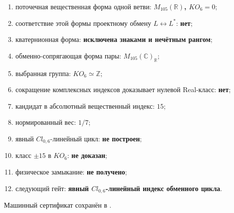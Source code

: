 \begin{protocol}
\begin{enumerate}
 \item поточечная вещественная форма одной ветви:
 \textbf{$M_{105}(\mathbb R)$, $KO_6=0$};
 \item соответствие этой формы проектному обмену $L\leftrightarrow L^*$:
 \textbf{нет};
 \item кватернионная форма: \textbf{исключена знаками и нечётным рангом};
 \item обменно-сопрягающая форма пары:
 \textbf{$M_{105}(\mathbb C)_{\mathbb R}$};
 \item выбранная группа: \textbf{$KO_6\simeq\mathbb Z$};
 \item сокращение комплексных индексов доказывает нулевой Real-класс:
 \textbf{нет};
 \item кандидат в абсолютный вещественный индекс: \textbf{$15$};
 \item нормированный вес: \textbf{$1/7$};
 \item явный $Cl_{0,6}$-линейный цикл: \textbf{не построен};
 \item класс $\pm15$ в $KO_6$: \textbf{не доказан};
 \item физическое замыкание: \textbf{не получено};
 \item следующий гейт:
 \textbf{явный $Cl_{0,6}$-линейный индекс обменного цикла}.
\end{enumerate}
\end{protocol}

Машинный сертификат сохранён в
.